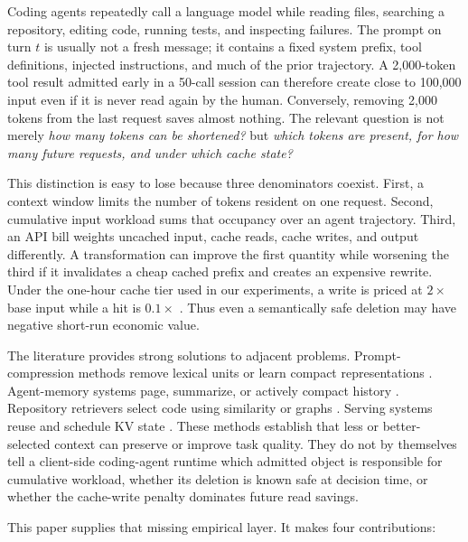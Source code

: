 \documentclass[10pt,twocolumn]{article}
\begin{document}
Coding agents repeatedly call a language model while reading files, searching a repository, editing
code, running tests, and inspecting failures.  The prompt on turn $t$ is usually not a fresh message;
it contains a fixed system prefix, tool definitions, injected instructions, and much of the prior
trajectory.  A 2,000-token tool result admitted early in a 50-call session can therefore create close
to 100,000 input \tokensturns{} even if it is never read again by the human.  Conversely, removing 2,000
tokens from the last request saves almost nothing.  The relevant question is not merely \emph{how
many tokens can be shortened?} but \emph{which tokens are present, for how many future requests, and
under which cache state?}

This distinction is easy to lose because three denominators coexist.  First, a context window limits
the number of tokens resident on one request.  Second, cumulative input workload sums that occupancy
over an agent trajectory.  Third, an API bill weights uncached input, cache reads, cache writes, and
output differently.  A transformation can improve the first quantity while worsening the third if it
invalidates a cheap cached prefix and creates an expensive rewrite.  Under the one-hour cache tier
used in our experiments, a write is priced at $2\times$ base input while a hit is $0.1\times$
\cite{anthropicPromptCaching}.  Thus even a semantically safe deletion may have negative short-run
economic value.

The literature provides strong solutions to adjacent problems.  Prompt-compression methods remove
lexical units or learn compact representations \cite{jiang2023llmlingua,jiang2024longllmlingua,
pan2024llmlingua2,ge2024icae,xu2024recomp}.  Agent-memory systems page, summarize, or actively compact
history \cite{packer2023memgpt,liu2026cat,verma2026focus,zhang2026autocompact}.  Repository retrievers
select code using similarity or graphs \cite{zhang2023repocoder,liu2024graphcoder,chen2025locagent}.
Serving systems reuse and schedule KV state \cite{kwon2023pagedattention,zheng2024sglang,
gim2024promptcache,srivatsa2024preble}.  These methods establish that less or better-selected context
can preserve or improve task quality.  They do not by themselves tell a client-side coding-agent
runtime which admitted object is responsible for cumulative workload, whether its deletion is known
safe at decision time, or whether the cache-write penalty dominates future read savings.

This paper supplies that missing empirical layer.  It makes four contributions:
\end{document}
